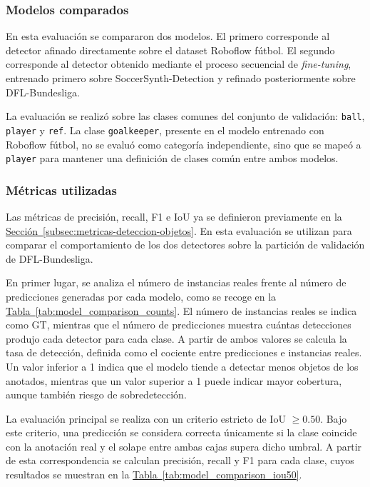 \subsubsection{Modelos comparados}

En esta evaluación se compararon dos modelos. El primero corresponde al detector afinado directamente sobre el dataset Roboflow fútbol. El segundo corresponde al detector obtenido mediante el proceso secuencial de \textit{fine-tuning}, entrenado primero sobre SoccerSynth-Detection y refinado posteriormente sobre DFL-Bundesliga.

La evaluación se realizó sobre las clases comunes del conjunto de validación: \texttt{ball}, \texttt{player} y \texttt{ref}. La clase \texttt{goalkeeper}, presente en el modelo entrenado con Roboflow fútbol, no se evaluó como categoría independiente, sino que se mapeó a \texttt{player} para mantener una definición de clases común entre ambos modelos.


\subsubsection{Métricas utilizadas}

Las métricas de precisión, recall, F1 e IoU ya se definieron previamente en la \hyperref[subsec:metricas-deteccion-objetos]{Sección~\ref*{subsec:metricas-deteccion-objetos}}. En esta evaluación se utilizan para comparar el comportamiento de los dos detectores sobre la partición de validación de DFL-Bundesliga.

En primer lugar, se analiza el número de instancias reales frente al número de predicciones generadas por cada modelo, como se recoge en la \hyperref[tab:model_comparison_counts]{Tabla~\ref*{tab:model_comparison_counts}}. El número de instancias reales se indica como GT, mientras que el número de predicciones muestra cuántas detecciones produjo cada detector para cada clase. A partir de ambos valores se calcula la tasa de detección, definida como el cociente entre predicciones e instancias reales. Un valor inferior a 1 indica que el modelo tiende a detectar menos objetos de los anotados, mientras que un valor superior a 1 puede indicar mayor cobertura, aunque también riesgo de sobredetección.

La evaluación principal se realiza con un criterio estricto de IoU $\geq 0.50$. Bajo este criterio, una predicción se considera correcta únicamente si la clase coincide con la anotación real y el solape entre ambas cajas supera dicho umbral. A partir de esta correspondencia se calculan precisión, recall y F1 para cada clase, cuyos resultados se muestran en la \hyperref[tab:model_comparison_iou50]{Tabla~\ref*{tab:model_comparison_iou50}}.

